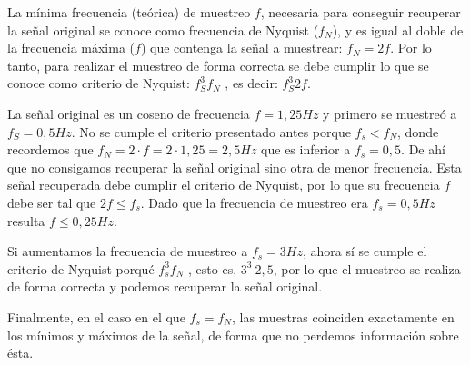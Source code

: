 \documentclass[a4paper,12pt]{article}
\begin{document}
\begin{enumerate}
La mínima frecuencia (teórica) de muestreo $f$, necesaria para conseguir recuperar la señal original se conoce como frecuencia de Nyquist ($f_N$), y es igual al doble de la frecuencia máxima ($f$) que contenga la señal a muestrear: $f_N = 2 f$. Por lo tanto, para realizar el muestreo de forma correcta se debe cumplir lo que se conoce como criterio de Nyquist: $f_{S}^{3} f_N$ , es decir: $f_{S}^{3} 2 f$.

La señal original es un coseno de frecuencia $f = 1,25 Hz$ y primero se muestreó a $f_S = 0,5 Hz$. No se cumple el criterio presentado antes porque $f_s < f_N$, donde recordemos que $f_N = 2 \cdot f = 2 \cdot 1,25 = 2,5 Hz$ que es inferior a $f_s = 0,5$. De ahí que no consigamos recuperar la señal original sino otra de menor frecuencia. Esta señal recuperada debe cumplir el criterio de Nyquist, por lo que su frecuencia $f$ debe ser tal que $2 f \leq f_s$. Dado que la frecuencia de muestreo era $f_s = 0,5 Hz$ resulta $f \leq 0,25 Hz$.

Si aumentamos la frecuencia de muestreo a $f_s = 3 Hz$, ahora sí se cumple el criterio de Nyquist porqué $f_s^3 f_N$ , esto es, $3^3\ 2,5$, por lo que el muestreo se realiza de forma correcta y podemos recuperar la señal original.

Finalmente, en el caso en el que $f_s = f_N$, las muestras coinciden exactamente en los mínimos y máximos de la señal, de forma que no perdemos información sobre ésta.

\end{enumerate}
\end{document}
